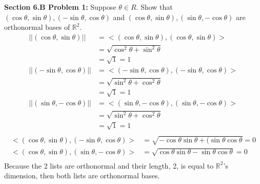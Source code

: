 \documentclass[12pt]{article}
\begin{document}
\newpage 

\noindent \textbf{Section 6.B Problem 1: }Suppose $\theta \in R$. Show that $(\cos \theta,\sin \theta),(-\sin \theta,\cos \theta)$ and $(\cos \theta,\sin \theta),(\sin \theta, -\cos \theta)$ are orthonormal bases of $\mathbb{R}^2$.
	\begin{align*}
		|| (\cos \theta,\sin \theta) || &= <(\cos \theta,\sin \theta),(\cos \theta,\sin \theta)> \\
		&= \sqrt{\cos ^2 \theta + \sin ^ 2 \theta} \\
		&= \sqrt{1} = 1 
		\\
		|| (-\sin \theta,\cos \theta) || &= <(-\sin \theta,\cos \theta), (-\sin \theta,\cos \theta)> \\
		&= \sqrt{\sin ^ 2 \theta + \cos ^2 \theta } \\
		&= \sqrt{1} = 1 \\
		|| (\sin \theta,-\cos \theta) || &= <(\sin \theta,-\cos \theta), (\sin \theta,-\cos \theta)> \\
		&= \sqrt{\sin ^ 2 \theta + \cos ^2 \theta } \\
		&= \sqrt{1} = 1 \\
	\end{align*}
	\begin{align*}
		<(\cos \theta,\sin \theta),(-\sin \theta,\cos \theta)> &= \sqrt{-\cos \theta\sin \theta +( \sin \theta\cos \theta } = 0 \\
		<(\cos \theta,\sin \theta),(\sin \theta,-\cos \theta)> &= \sqrt{\cos \theta\sin \theta - \sin \theta\cos \theta } = 0 \\
	\end{align*}
Because the 2 lists are orthonormal and their length, 2, is equal to $\mathbb{R}^2$'s dimension, then both lists are orthonormal bases.

\newpage 
\end{document}
